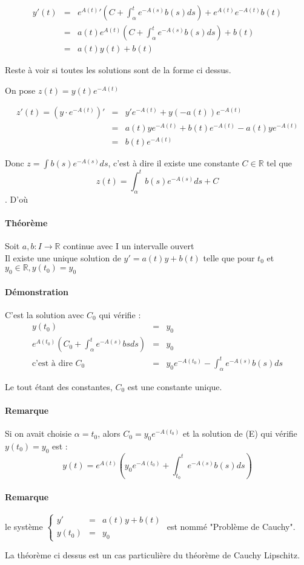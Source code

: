 	\[\begin{array}{rcl}
			y'(t) &=& {e^{A(t)}} '(C + \int_\alpha^t e^{-A(s)} b(s)ds) + e^{A(t)} e^{-A(t)} b(t) \\
	&=& a(t)e^{A(t)}(C + \int_\alpha^t e^{-A(s)}b(s)ds) + b(t)\\
						   &=& a(t) y(t) + b(t) \end{array}\]

	Reste à voir si toutes les solutions sont de la forme ci dessus.

	On pose $z(t) = y(t) e^{-A(t)}$

	\[\begin{array}{rcl}
			z'(t) = (y\cdot e^{-A(t)})' &=& y'e^{-A(t)} + y(-a(t))e^{-A(t)} \\
				 &=& a(t)ye^{-A(t)} + b(t)e^{-A(t)} - a(t)ye^{-A(t)} \\
					  &=& b(t)e^{-A(t)} \end{array}\]

			Donc $z = \int b(s)e^{-A(s)} ds$, c'est à dire il existe une constante $C \in \mathbb{R}$ tel que \[z(t) = \int_\alpha^t b(s)e^{-A(s)}ds + C\]. D'où 
			\begin{center}
			\end{center}

			\paragraph{Théorème}
			Soit $a, b : I \rightarrow \mathbb{R}$ continue avec I un intervalle ouvert ~\\
			Il existe une unique solution de $y' = a(t) y + b(t)$ telle que pour $t_0$ et $y_0 \in \mathbb{R}, y(t_0) = y_0$

			\paragraph{Démonstration} C'est la solution avec $C_0$ qui vérifie : \[\begin{array}{rcl}
					y(t_0) &=& y_0 \\
				e^{A(t_0)}(C_0 + \int_\alpha^t e^{-A(s)}bsds) &=& y_0 \\
			\text{c'est à dire } C_0 &=& y_0e^{-A(t_0)} - \int_\alpha^t e^{-A(s)}b(s)ds\end{array}\]

Le tout étant des constantes, $C_0$ est une constante unique.

\paragraph{Remarque} Si on avait choisie $\alpha = t_0$, alors $C_0 = y_0e^{-A(t_0)}$ et la solution de (E) qui vérifie $y(t_0)=y_0$ est : \[y(t) = e^{A(t)}(y_0e^{-A(t_0)} + \int_{t_0}^t e^{-A(s)}b(s) ds)\]

\paragraph{Remarque} le système $\left\{\begin{array}{rcl} y' &=& a(t)y + b(t) \\
y(t_0) &=& y_0\end{array}\right.$ est nommé "Problème de Cauchy".

La théorème ci dessus est un cas particulière du théorème de Cauchy Lipschitz.
